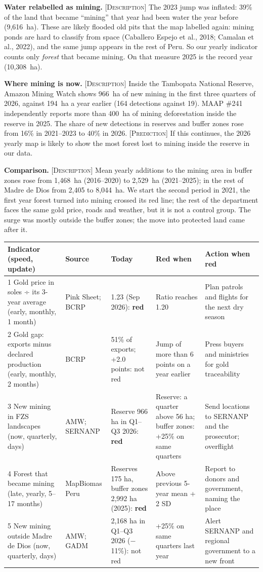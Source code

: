 \documentclass[10pt,a4paper]{article}
\newcommand{\lab}[1]{{\footnotesize\textsc{[#1]}}}
\newcommand{\red}{\textcolor{alert}{\textbf{red}}}
\begin{document}
\textbf{Water relabelled as mining.} \lab{Description} The 2023 jump was inflated: 39\% of the land that became ``mining'' that year had been water the year before (9,616~ha). These are likely flooded old pits that the map labelled again: mining ponds are hard to classify from space (Caballero Espejo et al., 2018; Camalan et al., 2022), and the same jump appears in the rest of Peru. So our yearly indicator counts only \emph{forest} that became mining. On that measure 2025 is the record year (10,308~ha).

\textbf{Where mining is now.} \lab{Description} Inside the Tambopata National Reserve, Amazon Mining Watch shows 966~ha of new mining in the first three quarters of 2026, against 194~ha a year earlier (164 detections against 19). MAAP \#241 independently reports more than 400~ha of mining deforestation inside the reserve in 2025. The share of new detections in reserves and buffer zones rose from 16\% in 2021--2023 to 40\% in 2026. \lab{Prediction} If this continues, the 2026 yearly map is likely to show the most forest lost to mining inside the reserve in our data.

\textbf{Comparison.} \lab{Description} Mean yearly additions to the mining area in buffer zones rose from 1,468~ha (2016--2020) to 2,529~ha (2021--2025); in the rest of Madre de Dios from 2,405 to 8,044~ha. We start the second period in 2021, the first year forest turned into mining crossed its red line; the rest of the department faces the same gold price, roads and weather, but it is not a control group. The surge was mostly outside the buffer zones; the move into protected land came after it.

\vspace{0.3ex}
{\footnotesize
\begin{tabularx}{\textwidth}{@{}p{3.3cm}p{1.6cm}p{3.5cm}LL@{}}
\toprule
Indicator (speed, update) & Source & Today & Red when & Action when red \\
 Gold price in soles ÷ its 3-year average (early, monthly, 1 month) & Pink Sheet; BCRP & 1.23 (Sep 2026): \red & Ratio reaches 1.20 & Plan patrols and flights for the next dry season \\
2 Gold gap: exports minus declared production (early, monthly, 2 months) & BCRP & 51\% of exports; +2.0 points: not red & Jump of more than 6 points on a year earlier & Press buyers and ministries for gold traceability \\
3 New mining in FZS landscapes (now, quarterly, days) & AMW; SERNANP & Reserve 966 ha in Q1--Q3 2026: \red & Reserve: a quarter above 56 ha; buffer zones: +25\% on same quarters & Send locations to SERNANP and the prosecutor; overflight \\
4 Forest that became mining (late, yearly, 5--17 months) & MapBiomas Peru & Reserves 175 ha, buffer zones 2,992 ha (2025): \red & Above previous 5-year mean + 2 SD & Report to donors and government, naming the place \\
5 New mining outside Madre de Dios (now, quarterly, days) & AMW; GADM & 2,168 ha in Q1--Q3 2026 ($-$11\%): not red & +25\% on same quarters last year & Alert SERNANP and regional government to a new front \\
\bottomrule
\end{tabularx}}
\end{document}
